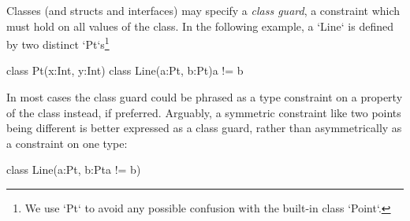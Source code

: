 
Classes (and structs and interfaces) may specify a {\em class guard}, a
constraint which must hold on all values of the class.    In the following
example, a \xcd`Line` is defined by two distinct \xcd`Pt`s\footnote{We use \xcd`Pt`
to avoid any possible confusion with the built-in class \xcd`Point`.}
\begin{xten}
class Pt(x:Int, y:Int){}
class Line(a:Pt, b:Pt){a != b} {}
\end{xten}
%

In most cases the class guard could be phrased as a type constraint on a property of
the class instead, if preferred.  Arguably, a symmetric constraint like two
points being different is better expressed as a class guard, rather than
asymmetrically as a constraint on one type: 
\begin{xten}
class Line(a:Pt, b:Pt{a != b}) {}
\end{xten}
%



